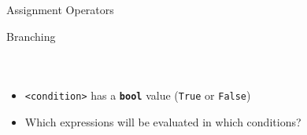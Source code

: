        \begin{frame}{Assignment Operators}
            \LARGE
			\begin{table}[]
			\end{table}
        \end{frame}

        \begin{frame}{Branching}
            \vspace{-3mm}
            \begin{columns}
                \inputminted[firstline=1, lastline=4, frame=single,framesep=2pt]{python3}{../Lecture2/code-examples/branching.py}
                \inputminted[firstline=6, lastline=13, frame=single,framesep=2pt]{python3}{../Lecture2/code-examples/branching.py}
                \inputminted[firstline=15, lastline=27, frame=single,framesep=2pt]{python3}{../Lecture2/code-examples/branching.py}
            \end{columns}
            \begin{itemize}
                \item \texttt{<condition>} has a \textbf{\texttt{bool}} value (\texttt{True} or \texttt{False})
                \item Which expressions will be evaluated in which conditions?
            \end{itemize}
        \end{frame}

